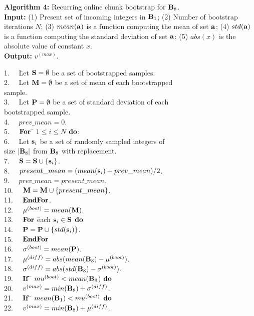 \documentclass[lettersize,journal]{IEEEtran}
\begin{document}
\vspace{0.2in}
\noindent
{\bf Algorithm 4:} Recurring online chunk bootstrap for ${\bf B}_{8}$. \\

\noindent
{\bf Input:} (1) Present set of incoming integers in ${\bf B}_{1}$; (2) Number of bootstrap iterations 
$N$; (3) $mean({\bf a})$ is a function computing the mean of set ${\bf a}$; (4) $std({\bf a})$ is a 
function computing the standard deviation of set ${\bf a}$; (5) $abs(x)$ is the absolute value of 
constant $x$. \\
{\bf Output:} $v^{(max)}$.

\begin{tabbing}
1.~~ \= Let ${\bf S} = \emptyset$ be a set of bootstrapped samples. \\
2.~~ \> Let ${\bf M} = \emptyset$ be a set of mean of each bootstrapped \\
     \> sample. \\
3.~~ \> Let ${\bf P} = \emptyset$ be a set of standard deviation of each \\
     \> bootstrapped sample. \\
4.~~ \> $prev\_mean = 0$. \\
5.~~ \> ${\bf For}$ \= $1 \leq i \leq N$ ${\bf do}$: \\
6.~~ \>             \> Let ${\bf s}_{i}$ be a set of randomly sampled integers of \\
     \>             \> size $|{\bf B}_{8}|$ from ${\bf B}_{8}$ with replacement. \\
7.~~ \>             \> ${\bf S} = {\bf S} \cup \{{\bf s}_{i}\}$. \\
8.~~ \>             \> $present\_mean = (mean({\bf s}_{i}) + prev\_mean)/2$. \\
9.~~ \>             \> $prev\_mean = present\_mean$. \\
10.~~\>             \> ${\bf M} = {\bf M} \cup \{present\_mean\}$. \\
11.~~\> ${\bf EndFor}$. \\
12.~~\> $\mu^{(boot)} = mean({\bf M})$. \\
13.~~\> ${\bf For}$ \= each ${\bf s}_{i} \in {\bf S}$ ${\bf do}$ \\
14.~~\>             \> ${\bf P} = {\bf P} \cup \{std({\bf s}_{i})\}$. \\
15.~~\> ${\bf EndFor}$ \\
16.~~\> $\sigma^{(boot)} = mean({\bf P})$. \\
17.~~\> $\mu^{(diff)} = abs(mean({\bf B}_{8}) - \mu^{(boot)})$. \\
18.~~\> $\sigma^{(diff)} = abs(std({\bf B}_{8}) - \sigma^{(boot)})$. \\
19.~~\> ${\bf If}$ \= $mu^{(boot)} < mean({\bf B}_{8}$) ${\bf do}$ \\
20.~~\>            \> $v^{(max)} = min({\bf B}_{8}) + \sigma^{(diff)}$. \\ 
21.~~\> ${\bf If}$ \= $mean({\bf B}_{1}) < mu^{(boot)}$ ${\bf do}$ \\
22.~~\>            \> $v^{(max)} = min({\bf B}_{8}) + \mu^{(diff)}$.
\end{tabbing}
\end{document}
